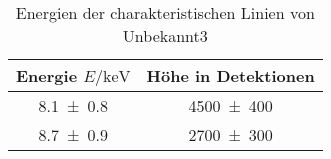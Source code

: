 
\begin{table}[H]
    \centering
    \caption{Energien der charakteristischen Linien von Unbekannt3}
    \label{tab:label}
    \begin{tabular}{c|c}
       Energie $E/\unit{\kilo\electronvolt}$ & Höhe in Detektionen \\
\hline
\num{8.1\pm 0.8} & \num{4500\pm 400} \\ 
\num{8.7\pm 0.9} & \num{2700\pm 300} \\ 

    \end{tabular}
\end{table}